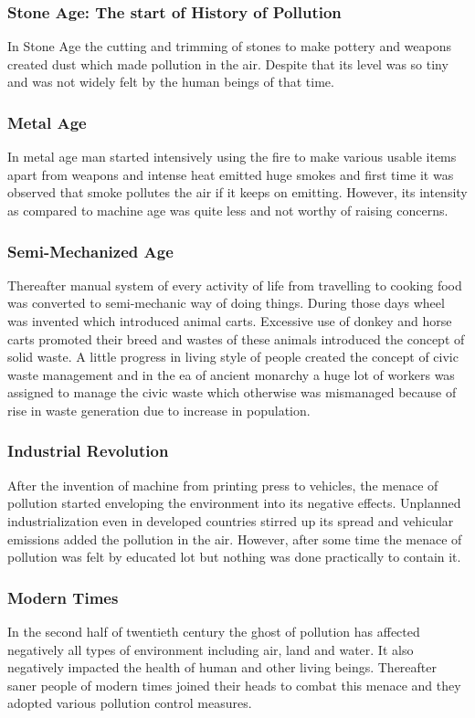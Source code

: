 \subsubsection{Stone Age: The start of History of Pollution}
In Stone Age the cutting and trimming of stones to make pottery and weapons created dust which made pollution in the air. Despite that its level was so tiny and was not widely felt by the human beings of that time.

\subsubsection{Metal Age}
In metal age man started intensively using the fire to make various usable items apart from weapons and intense heat emitted huge smokes and first time it was observed that smoke pollutes the air if it keeps on emitting. However, its intensity as compared to machine age was quite less and not worthy of raising concerns.

\subsubsection{Semi-Mechanized Age}
Thereafter manual system of every activity of life from travelling to cooking food was converted to semi-mechanic way of doing things. During those days wheel was invented which introduced animal carts. Excessive use of donkey and horse carts promoted their breed and wastes of these animals introduced the concept of solid waste. A little progress in living style of people created the concept of civic waste management and in the ea of ancient monarchy a huge lot of workers was assigned to manage the civic waste which otherwise was mismanaged because of rise in waste generation due to increase in population.

\subsubsection{Industrial Revolution}
After the invention of machine from printing press to vehicles, the menace of pollution started enveloping the environment into its negative effects. Unplanned industrialization even in developed countries stirred up its spread and vehicular emissions added the pollution in the air. However, after some time the menace of pollution was felt by educated lot but nothing was done practically to contain it.

\subsubsection{Modern Times}
In the second half of twentieth century the ghost of pollution has affected negatively all types of environment including air, land and water. It also negatively impacted the health of human and other living beings. Thereafter saner people of modern times joined their heads to combat this menace and they adopted various pollution control measures.

